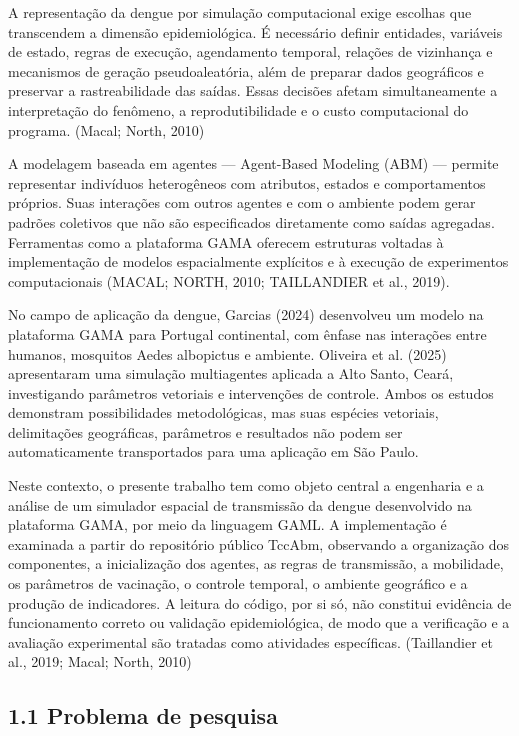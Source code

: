 A representação da dengue por simulação computacional exige escolhas que
transcendem a dimensão epidemiológica. É necessário definir entidades,
variáveis de estado, regras de execução, agendamento temporal, relações
de vizinhança e mecanismos de geração pseudoaleatória, além de preparar
dados geográficos e preservar a rastreabilidade das saídas. Essas
decisões afetam simultaneamente a interpretação do fenômeno, a
reprodutibilidade e o custo computacional do programa. (Macal; North,
2010)

A modelagem baseada em agentes --- Agent-Based Modeling (ABM) ---
permite representar indivíduos heterogêneos com atributos, estados e
comportamentos próprios. Suas interações com outros agentes e com o
ambiente podem gerar padrões coletivos que não são especificados
diretamente como saídas agregadas. Ferramentas como a plataforma GAMA
oferecem estruturas voltadas à implementação de modelos espacialmente
explícitos e à execução de experimentos computacionais (MACAL; NORTH,
2010; TAILLANDIER et al., 2019).

No campo de aplicação da dengue, Garcias (2024) desenvolveu um modelo na
plataforma GAMA para Portugal continental, com ênfase nas interações
entre humanos, mosquitos Aedes albopictus e ambiente. Oliveira et al.
(2025) apresentaram uma simulação multiagentes aplicada a Alto Santo,
Ceará, investigando parâmetros vetoriais e intervenções de controle.
Ambos os estudos demonstram possibilidades metodológicas, mas suas
espécies vetoriais, delimitações geográficas, parâmetros e resultados
não podem ser automaticamente transportados para uma aplicação em São
Paulo.

Neste contexto, o presente trabalho tem como objeto central a engenharia
e a análise de um simulador espacial de transmissão da dengue
desenvolvido na plataforma GAMA, por meio da linguagem GAML. A
implementação é examinada a partir do repositório público TccAbm,
observando a organização dos componentes, a inicialização dos agentes,
as regras de transmissão, a mobilidade, os parâmetros de vacinação, o
controle temporal, o ambiente geográfico e a produção de indicadores. A
leitura do código, por si só, não constitui evidência de funcionamento
correto ou validação epidemiológica, de modo que a verificação e a
avaliação experimental são tratadas como atividades específicas.
(Taillandier et al., 2019; Macal; North, 2010)

\subsection{1.1 Problema de pesquisa}\label{problema-de-pesquisa}

